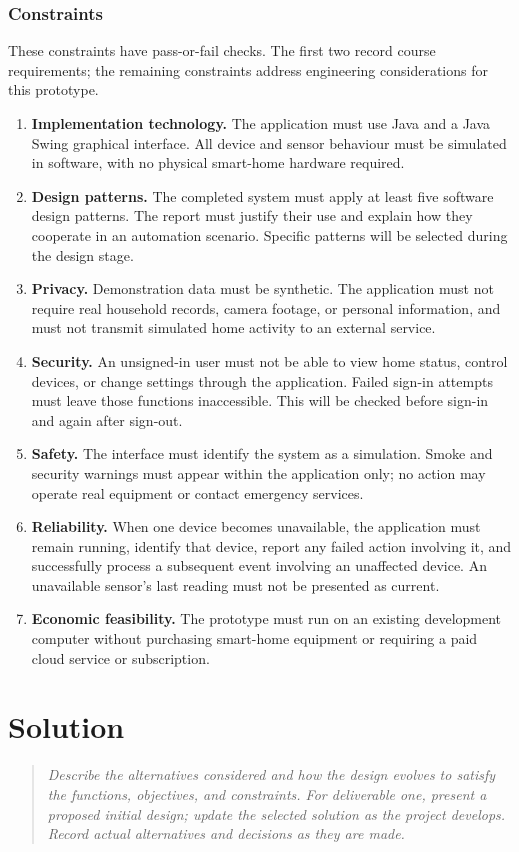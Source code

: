 \documentclass[12pt,letterpaper]{report}
\newcommand{\templateprompt}[1]{%
  \begin{quote}\color{PromptGray}\itshape #1\end{quote}%
}
\begin{document}
\subsection{Constraints}
These constraints have pass-or-fail checks. The first two record course requirements; the remaining constraints address engineering considerations for this prototype.
\begin{enumerate}[label=\textbf{C\arabic*.},leftmargin=*]
  \item \textbf{Implementation technology.} The application must use Java and a Java Swing graphical interface. All device and sensor behaviour must be simulated in software, with no physical smart-home hardware required.
  \item \textbf{Design patterns.} The completed system must apply at least five software design patterns. The report must justify their use and explain how they cooperate in an automation scenario. Specific patterns will be selected during the design stage.
  \item \textbf{Privacy.} Demonstration data must be synthetic. The application must not require real household records, camera footage, or personal information, and must not transmit simulated home activity to an external service.
  \item \textbf{Security.} An unsigned-in user must not be able to view home status, control devices, or change settings through the application. Failed sign-in attempts must leave those functions inaccessible. This will be checked before sign-in and again after sign-out.
  \item \textbf{Safety.} The interface must identify the system as a simulation. Smoke and security warnings must appear within the application only; no action may operate real equipment or contact emergency services.
  \item \textbf{Reliability.} When one device becomes unavailable, the application must remain running, identify that device, report any failed action involving it, and successfully process a subsequent event involving an unaffected device. An unavailable sensor's last reading must not be presented as current.
  \item \textbf{Economic feasibility.} The prototype must run on an existing development computer without purchasing smart-home equipment or requiring a paid cloud service or subscription.
\end{enumerate}

\chapter{Solution}
\templateprompt{Describe the alternatives considered and how the design evolves to satisfy the functions, objectives, and constraints. For deliverable one, present a proposed initial design; update the selected solution as the project develops. Record actual alternatives and decisions as they are made.}
\end{document}
